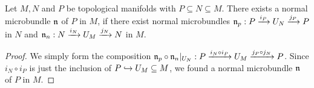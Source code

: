 \\
Let $M, N$ and $P$ be topological manifolds with $P \subseteq N \subseteq M$.
There exists a normal microbundle $\bundlen$ of $P$ in $M$, if
there exist normal microbundles $\bundlen_p: \bundle{P}{U_N}{i_P}{j_P}$ in $N$ and $\bundlen_n: \bundle{N}{U_M}{i_N}{j_N}$ in $M$.
\begin{proof}
We simply form the composition $\bundlen_p \circ \bundlen_n\restrict{U_N}: \bundle{P}{U_M}{i_N \circ i_P}{j_P \circ j_N}$.
Since $i_N \circ i_P$ is just the inclusion of $P \incl U_M \subseteq M$, we found a normal microbundle $\bundlen$ of $P$ in $M$.
\end{proof}